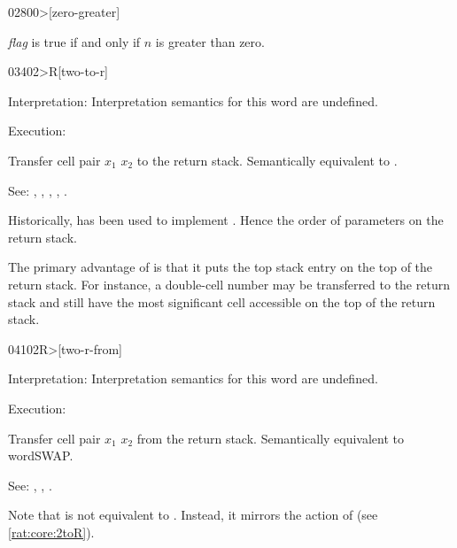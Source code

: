 \begin{newword}[0more]{0280}{0>}[zero-greater]

	\emph{flag} is true if and only if $n$ is greater than zero.
\end{newword}


\begin{newword*}[2toR]{0340}{2>R}[two-to-r]
\item[Interpretation:]
	Interpretation semantics for this word are undefined.

\item[Execution:]

	Transfer cell pair $x_1$ $x_2$ to the return stack. Semantically
	equivalent to   .

\item[See:]
	,
	,
	,
	,
	.

	\begin{rationale} %
		Historically,  has been used to implement .
		Hence the order of parameters on the return stack.

		The primary advantage of  is that it puts the top
		stack entry on the top of the return stack. For instance, a
		double-cell number may be transferred to the return stack and
		still have the most significant cell accessible on the top of
		the return stack.
	\end{rationale}
\end{newword*}


\begin{newword*}[2Rfrom]{0410}{2R>}[two-r-from]
\item[Interpretation:]
	Interpretation semantics for this word are undefined.

\item[Execution:]

	Transfer cell pair $x_1$ $x_2$ from the return stack.
	Semantically equivalent to   word{SWAP}.

\item[See:]
	,
	,
	.

	\begin{rationale} %
		Note that  is not equivalent to  .
		Instead, it mirrors the action of 
		(see \ref{rat:core:2toR}).
	\end{rationale}
\end{newword*}


